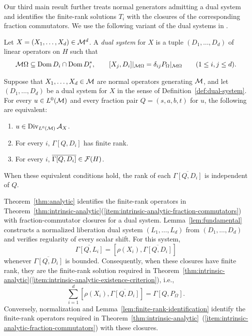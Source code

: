 Our third main result further treats normal generators admitting a dual system and identifies the finite-rank solutions $T_i$ with the closures of the corresponding fraction commutators.
We use the following variant of the dual systems in \cite[Definition~5.1]{Voi98}.

\begin{definition}\label{def:dual-system}
Let $X=(X_1,\ldots,X_d)\in\mathcal M^d$.
A \emph{dual system} for $X$ is a tuple $(D_1,\ldots,D_d)$ of linear operators on $H$ such that
\begin{equation}\label{eq:analytic-hyp}
 \mathcal M\Omega\subseteq\operatorname{Dom} D_i\cap\operatorname{Dom} D_i^*,\qquad
 [X_j,D_i]|_{\mathcal M\Omega}=\delta_{ij}P_\Omega|_{\mathcal M\Omega}
 \qquad(1\leq i,j\leq d).
\end{equation}
\end{definition}

\begin{theorem}\label{thm:analytic}
Suppose that $X_1,\ldots,X_d\in\mathcal M$ are normal operators generating $\mathcal M$, and let $(D_1,\ldots,D_d)$ be a dual system for $X$ in the sense of Definition~\ref{def:dual-system}.
For every $u\in L^0(\mathcal M)$ and every fraction pair $Q=(s,a,b,t)$ for $u$, the following are equivalent:
\begin{enumerate}
\item $u\in\operatorname{Div}_{L^0(\mathcal M)}\mathcal A_X$.
\item For every $i$, $\Gamma[Q,D_i]$ has finite rank.
\item For every $i$, $\overline{\Gamma[Q,D_i]}\in\mathcal F(H)$.
\end{enumerate}
When these equivalent conditions hold, the rank of each $\overline{\Gamma[Q,D_i]}$ is independent of $Q$.
\end{theorem}

Theorem~\ref{thm:analytic} identifies the finite-rank operators in Theorem~\ref{thm:intrinsic-analytic}\textup{(\ref{item:intrinsic-analytic-fraction-commutators})} with fraction-commutator closures for a dual system.
Lemma~\ref{lem:fundamental} constructs a normalized liberation dual system $(L_1,\ldots,L_d)$ from $(D_1,\ldots,D_d)$ and verifies regularity of every scalar shift.
For this system,
\[
 \overline{\Gamma[Q,L_i]}
 =[\rho(X_i),\overline{\Gamma[Q,D_i]}]
\]
whenever $\overline{\Gamma[Q,D_i]}$ is bounded.
Consequently, when these closures have finite rank, they are the finite-rank solution required in Theorem~\ref{thm:intrinsic-analytic}\textup{(\ref{item:intrinsic-analytic-existence-criterion})}, i.e.,
\[
 \sum_{i=1}^d[\rho(X_i),\overline{\Gamma[Q,D_i]}]=\Gamma[Q,P_\Omega].
\]
Conversely, normalization and Lemma~\ref{lem:finite-rank-identification} identify the finite-rank operators required in Theorem~\ref{thm:intrinsic-analytic}~\textup{(\ref{item:intrinsic-analytic-fraction-commutators})} with these closures.

